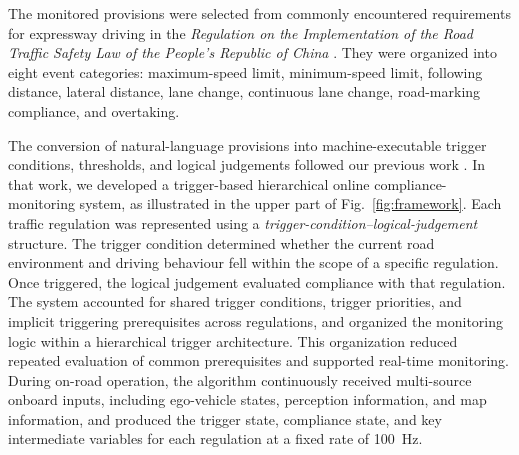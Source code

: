 \documentclass[pdflatex,sn-mathphys-num]{sn-jnl}
\begin{document}
The monitored provisions were selected from commonly encountered requirements for expressway driving in the \textit{Regulation on the Implementation of the Road Traffic Safety Law of the People's Republic of China} \cite{statecouncil2017regulation}. They were organized into eight event categories: maximum-speed limit, minimum-speed limit, following distance, lateral distance, lane change, continuous lane change, road-marking compliance, and overtaking.

The conversion of natural-language provisions into machine-executable trigger conditions, thresholds, and logical judgements followed our previous work \cite{yu2024online}. In that work, we developed a trigger-based hierarchical online compliance-monitoring system, as illustrated in the upper part of Fig.~\ref{fig:framework}. Each traffic regulation was represented using a \textit{trigger-condition--logical-judgement} structure. The trigger condition determined whether the current road environment and driving behaviour fell within the scope of a specific regulation. Once triggered, the logical judgement evaluated compliance with that regulation. The system accounted for shared trigger conditions, trigger priorities, and implicit triggering prerequisites across regulations, and organized the monitoring logic within a hierarchical trigger architecture. This organization reduced repeated evaluation of common prerequisites and supported real-time monitoring. During on-road operation, the algorithm continuously received multi-source onboard inputs, including ego-vehicle states, perception information, and map information, and produced the trigger state, compliance state, and key intermediate variables for each regulation at a fixed rate of 100~Hz.
\end{document}

